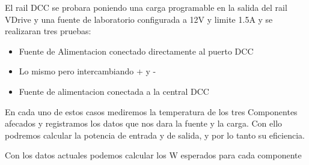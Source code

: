 
El rail DCC se probara poniendo una carga programable en la salida del rail VDrive y una
fuente de laboratorio configurada a 12V y limite 1.5A y se realizaran tres pruebas:

\begin{itemize}
    \item Fuente de Alimentacion conectado directamente al puerto DCC
    \item Lo mismo pero intercambiando + y -
    \item Fuente de alimentacion conectada a la central DCC
\end{itemize}

En cada uno de estos casos mediremos la temperatura de los tres Componentes
afecados y registramos los datos que nos dara la fuente y la carga. Con ello
podremos calcular la potencia de entrada y de salida, y por lo
tanto su eficiencia.

Con los datos actuales podemos calcular los \si{\watt} esperados para
cada componente

